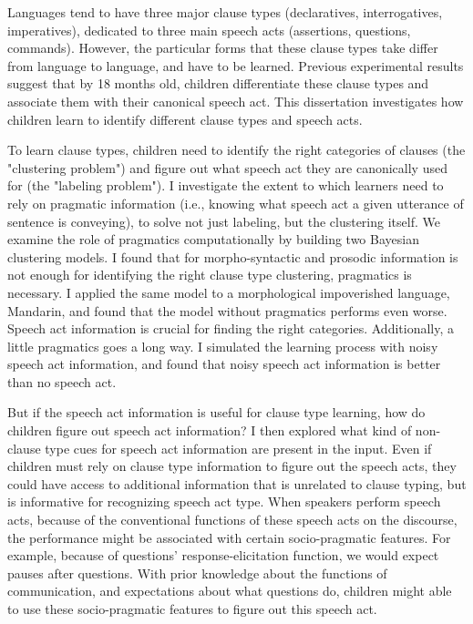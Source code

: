 
Languages tend to have three major clause types (declaratives, interrogatives, imperatives), dedicated to three main speech acts (assertions, questions, commands). However, the particular forms that these clause types take differ from language to language, and have to be learned. Previous experimental results suggest that by 18 months old, children differentiate these clause types and associate them with their canonical speech act. This dissertation investigates how children learn to identify different clause types and speech acts. 

To learn clause types, children need to identify the right categories of clauses (the "clustering problem") and figure out what speech act they are canonically used for (the "labeling problem"). I investigate the extent to which learners need to rely on pragmatic information (i.e., knowing what speech act a given utterance of sentence is conveying), to solve not just labeling, but the clustering itself. We examine the role of pragmatics computationally by building two Bayesian clustering models. I found that for morpho-syntactic and prosodic information is not enough for identifying the right clause type clustering, pragmatics is necessary. I applied the same model to a morphological impoverished language, Mandarin, and found that the model without pragmatics performs even worse. Speech act information is crucial for finding the right categories. Additionally, a little pragmatics goes a long way. I simulated the learning process with noisy speech act information, and found that noisy speech act information is better than no speech act.

 

But if the speech act information is useful for clause type learning, how do children figure out speech act information? I then explored what kind of non-clause type cues for speech act information are present in the input. Even if children must rely on clause type information to figure out the speech acts, they could have access to additional information that is unrelated to clause typing, but is informative for recognizing speech act type. When speakers perform speech acts, because of the conventional functions of these speech acts on the discourse, the performance might be associated with certain socio-pragmatic features. For example, because of questions' response-elicitation function, we would expect pauses after questions. With prior knowledge about the functions of communication, and expectations about what questions do, children might able to use these socio-pragmatic features to figure out this speech act. 

